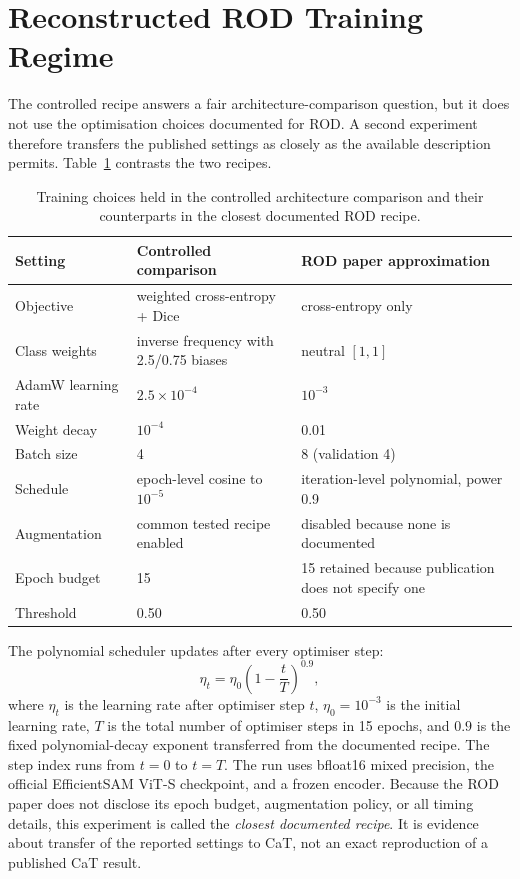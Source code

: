 \section{Reconstructed ROD Training Regime}

The controlled recipe answers a fair architecture-comparison question, but it
does not use the optimisation choices documented for ROD. A second experiment
therefore transfers the published settings as closely as the available
description permits. Table~\ref{tab:rod_recipe_config} contrasts the two
recipes.

\begin{table}[H]
\centering
\caption{Training choices held in the controlled architecture comparison and
their counterparts in the closest documented ROD recipe.}
\label{tab:rod_recipe_config}
\small
\begin{tabularx}{\textwidth}{@{}lXX@{}}
\toprule
\textbf{Setting} & \textbf{Controlled comparison} & \textbf{ROD paper approximation} \\
\midrule
Objective & weighted cross-entropy + Dice & cross-entropy only \\
Class weights & inverse frequency with 2.5/0.75 biases & neutral $[1,1]$ \\
AdamW learning rate & $2.5\times10^{-4}$ & $10^{-3}$ \\
Weight decay & $10^{-4}$ & 0.01 \\
Batch size & 4 & 8 (validation 4) \\
Schedule & epoch-level cosine to $10^{-5}$ & iteration-level polynomial, power 0.9 \\
Augmentation & common tested recipe enabled & disabled because none is documented \\
Epoch budget & 15 & 15 retained because publication does not specify one \\
Threshold & 0.50 & 0.50 \\
\bottomrule
\end{tabularx}
\end{table}

The polynomial scheduler updates after every optimiser step:
\begin{equation}
 \eta_t=\eta_0\left(1-\frac{t}{T}\right)^{0.9},
\end{equation}
where $\eta_t$ is the learning rate after optimiser step $t$, $\eta_0=10^{-3}$
is the initial learning rate, $T$ is the total number of optimiser steps in
15 epochs, and $0.9$ is the fixed polynomial-decay exponent transferred from
the documented recipe. The step index runs from $t=0$ to $t=T$. The run uses
bfloat16 mixed precision, the official EfficientSAM ViT-S checkpoint, and a
frozen encoder. Because the ROD paper does not disclose its epoch budget,
augmentation policy, or all timing details, this experiment is called the
\emph{closest documented recipe}. It is evidence about transfer of the
reported settings to CaT, not an exact reproduction of a published CaT result.

